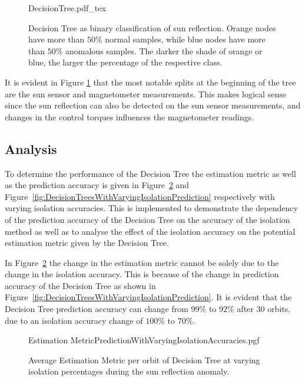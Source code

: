 \begin{figure}[!hbt]
	\centering
	\def\svgwidth{16cm}
	{DecisionTree.pdf_tex}
	\caption{Decision Tree as binary classification of sun reflection. Orange nodes have more than $50\%$ normal samples, while blue nodes have more than $50\%$ anomalous samples. The darker the shade of orange or blue, the larger the percentage of the respective class.}
	\label{fig:DecisionTree}
\end{figure}

It is evident in Figure \ref{fig:DecisionTree} that the most notable splits at the beginning of the tree are the sun sensor and magnetometer measurements. This makes logical sense since the sun reflection can also be detected on the sun sensor measurements, and changes in the control torques influences the magnetometer readings.

\subsection{Analysis}
To determine the performance of the Decision Tree the estimation metric as well as the prediction accuracy is given in Figure~\ref{fig:DecisionTreesWithVaryingIsolationEstimation} and Figure~\ref{fig:DecisionTreesWithVaryingIsolationPrediction} respectively with varying isolation accuracies. This is implemented to demonstrate the dependency of the prediction accuracy of the Decision Tree on the accuracy of the isolation method as well as to analyse the effect of the isolation accuracy on the potential estimation metric given by the Decision Tree.

In Figure~\ref{fig:DecisionTreesWithVaryingIsolationEstimation} the change in the estimation metric cannot be solely due to the change in the isolation accuracy. This is because of the change in prediction accuracy of the Decision Tree as shown in Figure~\ref{fig:DecisionTreesWithVaryingIsolationPrediction}. It is evident that the Decision Tree prediction accuracy can change from $99\%$ to $92\%$ after $30$ orbits, due to an isolation accuracy change of $100\%$ to $70\%$.
\begin{figure}[!htb]
	\centering
	{Estimation MetricPredictionWithVaryingIsolationAccuracies.pgf}
	
	\caption{Average Estimation Metric per orbit of Decision Tree at varying isolation percentages  during the sun reflection anomaly.}
	\label{fig:DecisionTreesWithVaryingIsolationEstimation}
\end{figure}

